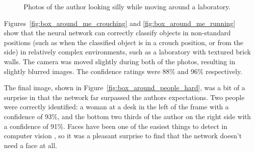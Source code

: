 \begin{figure}[h!]
    \centering
	\quad
    \caption{Photos of the author looking silly while moving around a laboratory.}
\end{figure}

Figures~\ref{fig:box_around_me_crouching} and \ref{fig:box_around_me_running} show that the neural network can correctly classify objects in non-standard positions (such as when the classified object is in a crouch position, or from the side) in relatively complex environments, such as a laboratory with textured brick walls. The camera was moved slightly during both of the photos, resulting in slightly blurred images. The confidence ratings were 88\% and 96\% respectively.

The final image, shown in Figure~\ref{fig:box_around_people_hard}, was a bit of a surprise in that the network far surpassed the authors expectations. Two people were correctly identified: a woman at a desk in the left of the frame with a confidence of 93\%, and the bottom two thirds of the author on the right side with a confidence of 91\%. Faces have been one of the easiest things to detect in computer vision \cite{website:face_detection_survey}, so it was a pleasant surprise to find that the network doesn't need a face at all.

